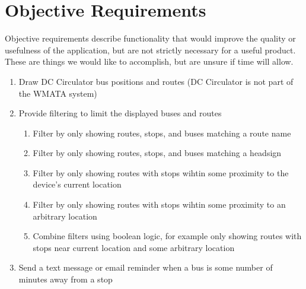 \documentclass[12pt]{article}
\begin{document}
\section*{Objective Requirements}
Objective requirements describe functionality that would improve the quality or usefulness of the application, but are not strictly necessary for a useful product.  These are things we would like to accomplish, but are unsure if time will allow.
\begin{enumerate}
\item Draw DC Circulator bus positions and routes (DC Circulator is not part of the WMATA system)
\item Provide filtering to limit the displayed buses and routes
\begin{enumerate}
\item Filter by only showing routes, stops, and buses matching a route name
\item Filter by only showing routes, stops, and buses matching a headsign
\item Filter by only showing routes with stops wihtin some proximity to the device's current location 
\item Filter by only showing routes with stops wihtin some proximity to an arbitrary location
\item Combine filters using boolean logic, for example only showing routes with stops near current location and some arbitrary location
\end{enumerate}
\item Send a text message or email reminder when a bus is some number of minutes away from a stop
\end{enumerate}
\end{document}
